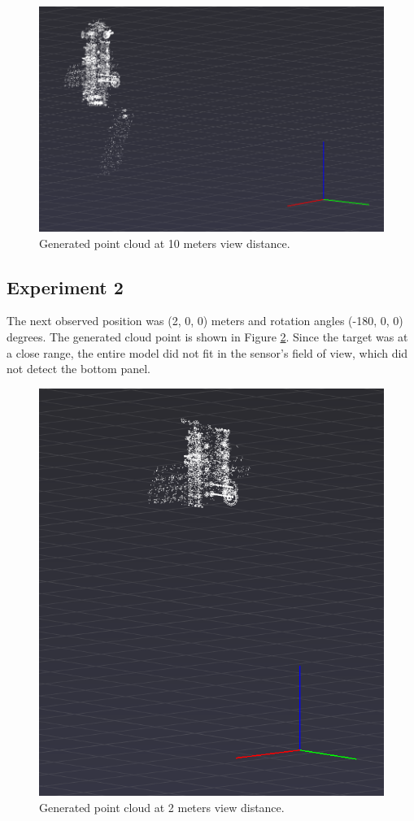 \documentclass[conference]{IEEEtran}
\begin{document}
		\begin{figure}[htbp]
			\centerline{\includegraphics[scale=1]{Images/Experiment1_10m.PNG}}
			\caption{Generated point cloud at 10 meters view distance.}
			\label{Experiment1pc}
		\end{figure}

	\subsection{Experiment 2}
	The next observed position was (2, 0, 0) meters and rotation angles (-180, 0, 0) degrees. The generated cloud point is shown in Figure \ref{Experiment2pc}. Since the target was at a close range, the entire model did not fit in the sensor's field of view, which did not detect the bottom panel.

	\begin{figure}[htbp]
		\centerline{\includegraphics[scale=1]{Images/Experiment2_2m.PNG}}
		\caption{Generated point cloud at 2 meters view distance.}
		\label{Experiment2pc}
	\end{figure}


	\nocite{*}
	\printbibliography
	
\end{document}
